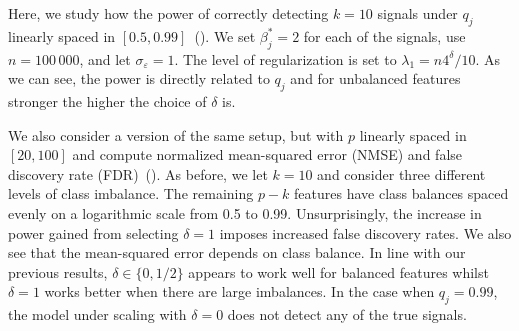 Here, we study how the power of correctly detecting \(k=10\) signals under \(q_j\) linearly
spaced in \([0.5, 0.99]\)~(). We set \(\beta^*_j = 2\) for each of
the signals, use \(n = 100\,000\), and let \(\sigma_\varepsilon = 1\). The level of
regularization is set to \(\lambda_1 = n 4^\delta/10\). As we can see, the power is
directly related to \(q_j\) and for unbalanced features stronger the higher the choice of
\(\delta\) is.

We also consider a version of the same setup, but with \(p\) linearly spaced in \([20,
    100]\) and compute normalized mean-squared error (NMSE) and false discovery rate
(FDR)~(). As before, we let \(k = 10\) and consider three
different levels of class imbalance. The remaining \(p-k\) features have class balances
spaced evenly on a logarithmic scale from 0.5 to 0.99. Unsurprisingly, the increase in
power gained from selecting \(\delta = 1\) imposes increased false discovery rates. We also
see that the mean-squared error depends on class balance. In line with our previous
results, \(\delta \in \{0, 1/2\}\) appears to work well for balanced features whilst
\(\delta = 1\) works better when there are large imbalances. In the case when \(q_j =
0.99\), the model under scaling with \(\delta = 0\) does not detect any of the true
signals.

